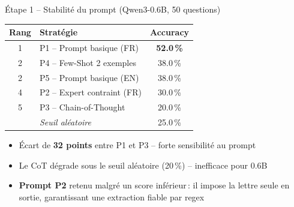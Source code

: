 \documentclass[aspectratio=169, 12pt]{beamer}
\begin{document}
\begin{frame}{\'Etape 1 -- Stabilit\'e du prompt (Qwen3-0.6B, 50 questions)}
  \begin{table}
    \centering
    \begin{tabular}{@{} c l c @{}}
      \toprule
      \textbf{Rang} & \textbf{Strat\'egie} & \textbf{Accuracy} \\
      \midrule
      1 & P1 -- Prompt basique (FR) & \textbf{52.0\,\%} \\
      2 & P4 -- Few-Shot 2 exemples & 38.0\,\% \\
      2 & P5 -- Prompt basique (EN) & 38.0\,\% \\
      4 & P2 -- Expert contraint (FR) & 30.0\,\% \\
      5 & P3 -- Chain-of-Thought & 20.0\,\% \\
      \midrule
      & \textit{Seuil al\'eatoire} & 25.0\,\% \\
      \bottomrule
    \end{tabular}
  \end{table}

  \vspace{0.2cm}

  \begin{itemize}
    \item \'Ecart de \textbf{32 points} entre P1 et P3 -- forte sensibilit\'e au prompt
    \item Le CoT d\'egrade sous le seuil al\'eatoire (20\,\%) -- inefficace pour 0.6B
    \item \textbf{Prompt P2} retenu malgr\'e un score inf\'erieur\,: il impose la lettre seule en sortie, garantissant une extraction fiable par regex
  \end{itemize}
\end{frame}
\end{document}
